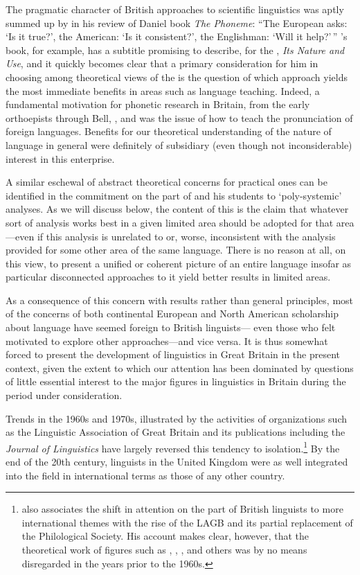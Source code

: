 The pragmatic character of British approaches to scientific
linguistics was aptly summed up by \citet{householder52:rvw.jones} in
his review of Daniel  book \textsl{The
  Phoneme}: ``The European asks: `Is it true?', the American: `Is it
consistent?', the Englishman: `Will it help?'\,'' {\Jones}'s book, for
example, has a subtitle promising to describe, for the ,
\textsl{Its Nature and Use}, and it quickly becomes clear that a
primary consideration for him in choosing among theoretical views of
the  is the question of which approach yields the most
immediate benefits in areas such as language teaching. Indeed, a
fundamental motivation for phonetic research in Britain, from the
early orthoepists through Bell, {\Sweet}, and {\Jones} was the issue of how
to teach the pronunciation of foreign languages. Benefits for our
theoretical understanding of the nature of language in general were
definitely of subsidiary (even though not inconsiderable) interest in
this enterprise.

A similar eschewal of abstract theoretical concerns for practical ones
can be identified in the commitment on the part of {\Firth} and his
students to `poly-systemic' analyses. As we will discuss below, the
content of this is the claim that whatever sort of analysis works best
in a given limited area should be adopted for that area—even if this
analysis is unrelated to or, worse, inconsistent with the analysis
provided for some other area of the same language. There is no reason
at all, on this view, to present a unified or coherent picture of an
entire language insofar as particular disconnected approaches to it
yield better results in limited areas.

As a consequence of this concern with results rather than general
principles, most of the concerns of both continental European and
North American scholarship about language have seemed foreign to
British linguists— even those who felt motivated to explore other
approaches—and vice versa. It is thus somewhat forced to present the
development of linguistics in Great Britain in the present context,
given the extent to which our attention has been dominated by
questions of little essential interest to the major figures in 
linguistics in Britain during the period under consideration.

Trends in the 1960s and 1970s, illustrated by the activities of
organizations such as the Linguistic Association of Great Britain and
its publications including the \textsl{Journal of Linguistics} have
largely reversed this tendency to
isolation.\footnote{\citet{matthews99:philsoc} also associates the
  shift in attention on the part of British linguists to more
  international themes with the rise of the LAGB and its partial
  replacement of the Philological Society. His account makes clear,
  however, that the theoretical work of figures such as {\Saussure},
  {\Trubetzkoy}, {\Hjelmslev}, {\Bloomfield} and others was by no means
  disregarded in the years prior to the 1960s.} By the end of the 20th
century, linguists in the United Kingdom were as well integrated into
the field in international terms as those of any other country.

